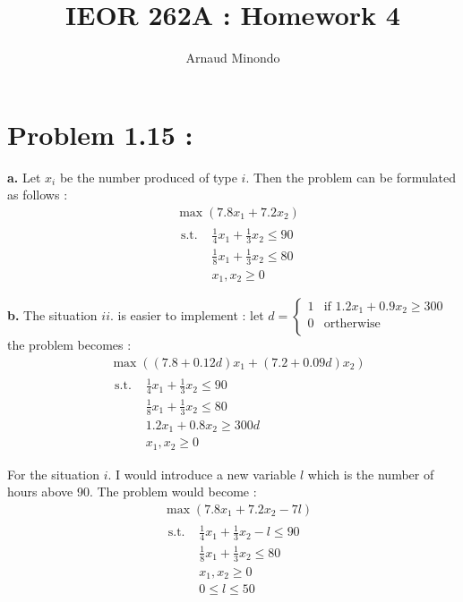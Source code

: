 \documentclass{article}
\title{IEOR 262A : Homework 4}
\author{Arnaud Minondo}
\begin{document}
\maketitle
\section*{Problem 1.15 :}
\textbf{a. } Let $x_i$ be the number produced of type $i$. Then the problem can be formulated as follows : 
$$\boxed{\begin{split}
    &\max(7.8x_1+7.2x_2)\\
    &\begin{split}
        \text{s.t. }&\frac{1}{4}x_1+\frac{1}{3}x_2\leq 90\\
        &\frac{1}{8}x_1+\frac{1}{3}x_2\leq 80\\
        &x_1,x_2\ge 0\\
    \end{split}\\
\end{split}}$$
\textbf{b.} The situation $ii.$ is easier to implement : let 
$d= \left\{\begin{array}{cl}
    1& \text{if } 1.2x_1+0.9x_2\ge300\\
    0& \text{ortherwise}\\
\end{array}\right.$ the problem becomes : $$\boxed{\begin{split}
    &\max((7.8+0.12d)x_1+(7.2+0.09d)x_2)\\
    &\begin{split}
        \text{s.t. }&\frac{1}{4}x_1+\frac{1}{3}x_2\leq 90\\
        &\frac{1}{8}x_1+\frac{1}{3}x_2\leq 80\\
        &1.2x_1+0.8x_2 \ge 300d\\        
        &x_1,x_2\ge 0\\
    \end{split}\\
\end{split}}$$
For the situation $i.$ I would introduce a new variable $l$ which is the number of hours above 90.
The problem would become :  $$\boxed{\begin{split}
    &\max(7.8x_1+7.2x_2-7l)\\
    &\begin{split}
        \text{s.t. }&\frac{1}{4}x_1+\frac{1}{3}x_2-l\leq 90\\
        &\frac{1}{8}x_1+\frac{1}{3}x_2\leq 80\\
        &x_1,x_2\ge 0\\
        &0\leq l\leq 50\\
    \end{split}\\
\end{split}}$$
\end{document}
